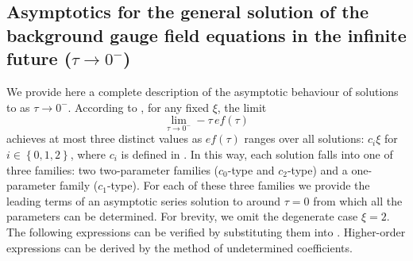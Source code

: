 \subsection{\label{app:t_to_0}Asymptotics for the general solution of the background gauge field equations in the infinite future (\texorpdfstring{$\tau\to0^-$}{\tau{}-}) }

We provide here a complete description of the asymptotic behaviour of solutions to  as $\tau\to0^{-}$. According to , for any fixed $\xi$, the limit 
\[
\lim_{\tau\to0^{-}}-\tau\,ef(\tau)
\]
achieves at most three distinct values as $ef(\tau)$ ranges over all solutions: $c_{i}\xi$ for $i\in\left\{ 0,1,2\right\} $, where $c_{i}$ is defined in . In this way, each solution falls into one of three families: two two-parameter families ($c_{0}$\nobreakdash-type and $c_{2}$\nobreakdash-type) and a one-parameter family ($c_{1}$\nobreakdash-type). For each of these three families we provide the leading terms of an asymptotic series solution to  around $\tau=0$ from which all the parameters can be determined. For brevity, we omit the degenerate case $\xi=2$. The following expressions can be verified by substituting them into . Higher-order expressions can be derived by the method of undetermined coefficients.
